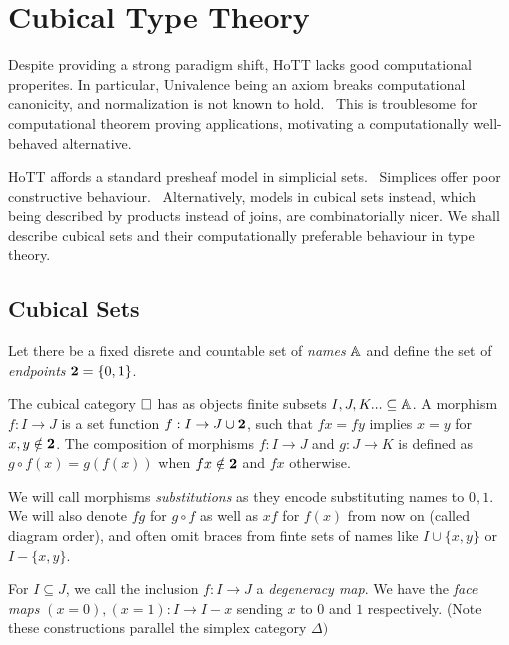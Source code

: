 \section{Cubical Type Theory}

Despite providing a strong paradigm shift, HoTT lacks good computational properites.
In particular, Univalence being an axiom breaks computational canonicity, and normalization is not known to hold.~\cite{HoTT}
This is troublesome for computational theorem proving applications, motivating a computationally well-behaved alternative. 

HoTT affords a standard presheaf model in simplicial sets.~\cite{kapulkin2021simplicial}  
Simplices offer poor constructive behaviour.~\cite{bezem2015non} Alternatively, models in cubical sets instead, which being described by products instead of joins, are 
combinatorially nicer. We shall describe cubical sets and their computationally preferable behaviour in type theory. 

\subsection{Cubical Sets}
Let there be a fixed disrete and countable set of \emph{names} $\mathbb{A}$ and define the set of \emph{endpoints} $\mathbf{2} = \{0,1\}$.
\begin{definition}
  The cubical category $\mathbf{\square}$ has as objects finite subsets $I, J, K... \subseteq \mathbb{A}$.
  A morphism $f : I \to J$ is a set function $f : I \to J \cup \mathbf{2}$, such that 
  $f x = f y$ implies $x = y$ for $x,y \notin \mathbf{2}$. 
  The composition of morphisms $f : I \to J$ and $g : J \to K$ is defined as 
    $g \circ f (x) = g(f(x))$ when $f x \notin \mathbf{2}$ and $f x$ otherwise.
  
\end{definition}
We will call morphisms \emph{substitutions} as they encode substituting names to ${0,1}$. 
We will also denote $fg$ for $g \circ f$ as well as $xf$ for $f(x)$ from now on (called diagram order),
and often omit braces from finte sets of names like $I \cup \{x, y\}$ or $I - \{x,y\}$. 

For $I \subseteq J$, we call the inclusion $f : I \to J$ a \emph{degeneracy map}. 
We have the \emph{face maps} $(x = 0), (x = 1) : I  \to I - x$ sending $x$ to $0$ and $1$ respectively. (Note these constructions parallel the simplex category ${\Delta})$

